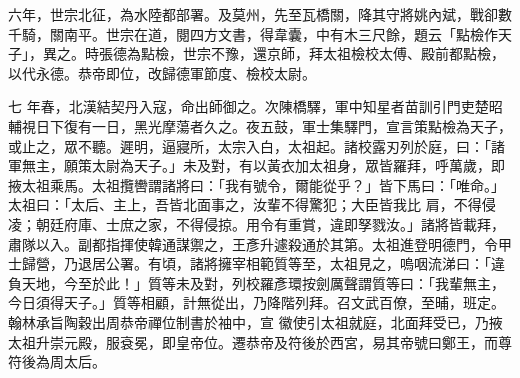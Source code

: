 \begin{pinyinscope}
 六年，世宗北征，為水陸都部署。及莫州，先至瓦橋關，降其守將姚內斌，戰卻數千騎，關南平。世宗在道，閱四方文書，得韋囊，中有木三尺餘，題云「點檢作天子」，異之。時張德為點檢，世宗不豫，還京師，拜太祖檢校太傅、殿前都點檢，以代永德。恭帝即位，改歸德軍節度、檢校太尉。



 七
 年春，北漢結契丹入寇，命出師御之。次陳橋驛，軍中知星者苗訓引門吏楚昭輔視日下復有一日，黑光摩蕩者久之。夜五鼓，軍士集驛門，宣言策點檢為天子，或止之，眾不聽。遲明，逼寢所，太宗入白，太祖起。諸校露刃列於庭，曰：「諸軍無主，願策太尉為天子。」未及對，有以黃衣加太祖身，眾皆羅拜，呼萬歲，即掖太祖乘馬。太祖攬轡謂諸將曰：「我有號令，爾能從乎？」皆下馬曰：「唯命。」太祖曰：「太后、主上，吾皆北面事之，汝輩不得驚犯；大臣皆我比
 肩，不得侵凌；朝廷府庫、士庶之家，不得侵掠。用令有重賞，違即孥戮汝。」諸將皆載拜，肅隊以入。副都指揮使韓通謀禦之，王彥升遽殺通於其第。太祖進登明德門，令甲士歸營，乃退居公署。有頃，諸將擁宰相範質等至，太祖見之，嗚咽流涕曰：「違負天地，今至於此！」質等未及對，列校羅彥環按劍厲聲謂質等曰：「我輩無主，今日須得天子。」質等相顧，計無從出，乃降階列拜。召文武百僚，至晡，班定。翰林承旨陶穀出周恭帝禪位制書於袖中，宣
 徽使引太祖就庭，北面拜受已，乃掖太祖升崇元殿，服袞冕，即皇帝位。遷恭帝及符後於西宮，易其帝號曰鄭王，而尊符後為周太后。




\end{pinyinscope}

